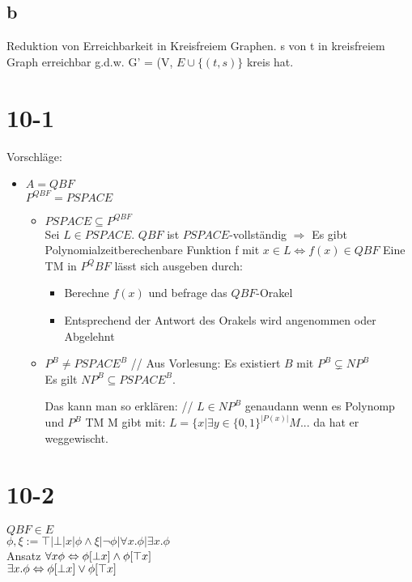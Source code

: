 \documentclass[12pt, oneside, a4paper, numbers=enddot, abstracton, parskip=full]{scrreprt}
\begin{document}
  \subsection{b}
  Reduktion von Erreichbarkeit in Kreisfreiem Graphen. s von t in kreisfreiem Graph erreichbar g.d.w. G' = (V, $E \cup \{(t, s)\}$ kreis hat.


\section{10-1}
Vorschläge:
\begin{itemize}
\item $A = QBF$ \\
  $P^{QBF} = PSPACE$
  \begin{itemize}
  \item $PSPACE \subseteq P^{QBF}$ \\ Sei $L \in PSPACE.$ $QBF$ ist
    $PSPACE$-vollständig $\Rightarrow$ Es gibt
    Polynomialzeitberechenbare Funktion f mit $x \in L \Leftrightarrow f(x) \in QBF$
    Eine TM in $P^QBF$ lässt sich ausgeben durch:
    \begin{itemize}
    \item Berechne $f(x)$ und befrage das $QBF$-Orakel
    \item Entsprechend der Antwort des Orakels wird angenommen oder Abgelehnt
    \end{itemize}
  \item $P^B \neq PSPACE^B$ //
    Aus Vorlesung: Es existiert $B$ mit $P^B \subsetneq NP^B$ \\
    Es gilt $NP^B \subseteq PSPACE^B$.

    Das kann man so erklären: //
    $L \in NP^B$ genaudann wenn es Polynomp  und $P^B$ TM M gibt mit:
    $L = \{x | \exists y \in \{ 0,1\}^{|P(x)|} M...$ da hat er weggewischt.

  \end{itemize}
\end{itemize}

\section{10-2}
$QBF \in E$ \\

$\phi, \xi := \top | \bot | x | \phi \land \xi | \neg \phi | \forall x . \phi | \exists x.\phi$ \\
Ansatz $ \forall x \phi \Leftrightarrow \phi [\bot \/ x ] \land \phi [ \top \/ x]$ \\
$ \exists x.\phi \Leftrightarrow \phi [\bot \/x ] \lor \phi [ \top \/ x ]$ \\
\end{document}

